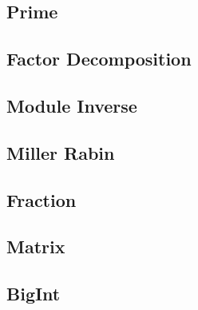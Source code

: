 \documentclass[a4paper,10pt,twocolumn,oneside]{article}
\begin{document}
\subsection{Prime}

\subsection{Factor Decomposition}

\subsection{Module Inverse}

\subsection{Miller Rabin}

\subsection{Fraction}

\subsection{Matrix}

\subsection{BigInt}

\newpage

\clearpage
\end{document}
